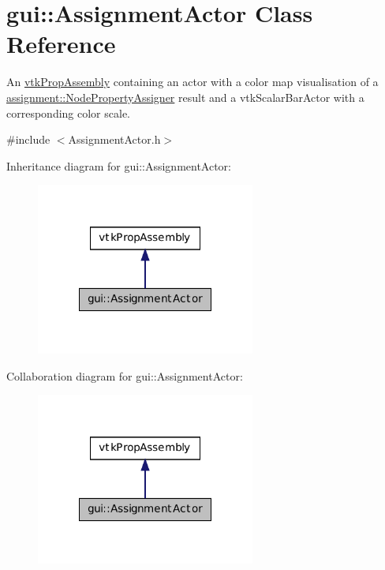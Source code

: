 \hypertarget{classgui_1_1_assignment_actor}{
\section{gui::AssignmentActor Class Reference}
\label{classgui_1_1_assignment_actor}
}


An \hyperlink{classvtk_prop_assembly}{vtkPropAssembly} containing an actor with a color map visualisation of a \hyperlink{classassignment_1_1_node_property_assigner}{assignment::NodePropertyAssigner} result and a vtkScalarBarActor with a corresponding color scale.  




{\ttfamily \#include $<$AssignmentActor.h$>$}



Inheritance diagram for gui::AssignmentActor:\nopagebreak
\begin{figure}[H]
\begin{center}
\leavevmode
\includegraphics[width=204pt]{classgui_1_1_assignment_actor__inherit__graph}
\end{center}
\end{figure}


Collaboration diagram for gui::AssignmentActor:\nopagebreak
\begin{figure}[H]
\begin{center}
\leavevmode
\includegraphics[width=204pt]{classgui_1_1_assignment_actor__coll__graph}
\end{center}
\end{figure}
